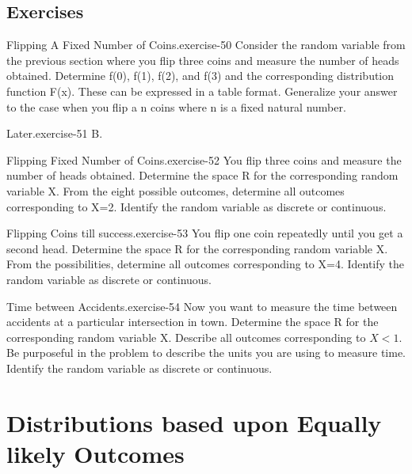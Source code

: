 \documentclass[10pt,]{book}
\numberwithin{equation}{section}
\newcommand{\lt}{<}
\begin{document}
\section[{Exercises}]{Exercises}\label{section-38}
\begin{inlineexercise}{Flipping A Fixed Number of Coins.}{exercise-50}%
\hypertarget{p-785}{}%
Consider the random variable from the previous section where you flip three coins and measure the number of heads obtained. Determine f(0), f(1), f(2), and f(3) and the corresponding distribution function F(x). These can be expressed in a table format. Generalize your answer to the case when you flip a n coins where n is a fixed natural number.%
\end{inlineexercise}
\begin{inlineexercise}{Later.}{exercise-51}%
\hypertarget{p-786}{}%
B.%
\end{inlineexercise}
\begin{inlineexercise}{Flipping Fixed Number of Coins.}{exercise-52}%
\hypertarget{p-787}{}%
You flip three coins and measure the number of heads obtained. Determine the space R for the corresponding random variable X. From the eight possible outcomes, determine all outcomes corresponding to X=2. Identify the random variable as discrete or continuous.%
\end{inlineexercise}
\begin{inlineexercise}{Flipping Coins till success.}{exercise-53}%
\hypertarget{p-788}{}%
You flip one coin repeatedly until you get a second head. Determine the space R for the corresponding random variable X. From the possibilities, determine all outcomes corresponding to X=4. Identify the random variable as discrete or continuous.%
\end{inlineexercise}
\begin{inlineexercise}{Time between Accidents.}{exercise-54}%
\hypertarget{p-789}{}%
Now you want to measure the time between accidents at a particular intersection in town. Determine the space R for the corresponding random variable X. Describe all outcomes corresponding to \(X \lt 1\). Be purposeful in the problem to describe the units you are using to measure time. Identify the random variable as discrete or continuous.%
\end{inlineexercise}
%
%
\typeout{************************************************}
\typeout{************************************************}
%
\chapter[{Distributions based upon Equally likely Outcomes}]{Distributions based upon Equally likely Outcomes}\label{UniformHypergeometric}
%
%
\typeout{************************************************}
\typeout{************************************************}
%
\end{document}
